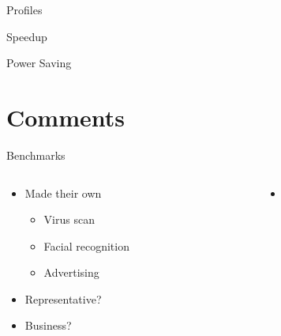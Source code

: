 \documentclass{beamer}
\begin{document}
\begin{frame}{Profiles}
\end{frame}

\begin{frame}{Speedup}
\end{frame}

\begin{frame}{Power Saving}
\end{frame}

\section{Comments}

\begin{frame}{Benchmarks}
\begin{columns}
\begin{column}{5cm}
\begin{itemize}
	\item Made their own
	\begin{itemize}
		\item Virus scan
		\item Facial recognition
		\item Advertising
	\end{itemize}
	\item Representative?
	\item Business?
\end{itemize}
\end{column}
\begin{column}{5cm}
\begin{itemize}
	\begin{itemize}
		\item {}
	\end{itemize}
\end{itemize}
\end{column}
\end{columns}
\end{frame}
\end{document}

